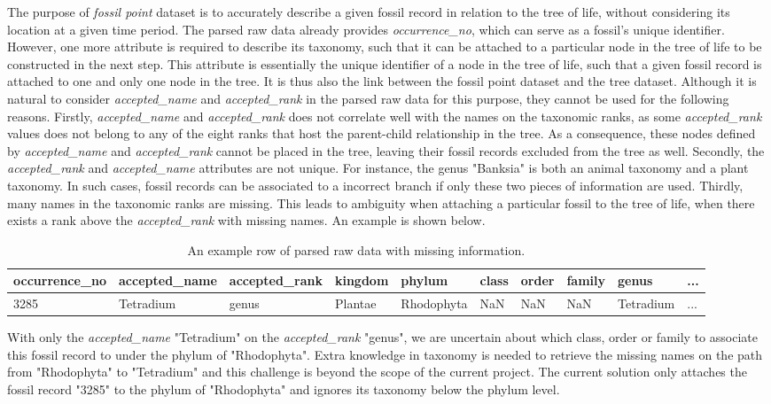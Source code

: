 \documentclass[11pt, a4paper,oneside,chapterprefix=false]{scrbook}
\begin{document}
The purpose of \emph{fossil point} dataset is to accurately describe a given fossil record in relation to the tree of life, without considering its location at a given time period. The parsed raw data already provides \emph{occurrence\_no}, which can serve as a fossil's unique identifier. However, one more attribute is required to describe its taxonomy, such that it can be attached to a particular node in the tree of life to be constructed in the next step. This attribute is essentially the unique identifier of a node in the tree of life, such that a  given fossil record is attached to one and only one node in the tree. It is thus also the link between the fossil point dataset and the tree dataset. Although it is natural to consider \emph{accepted\_name} and \emph{accepted\_rank} in the parsed raw data for this purpose, they cannot be used for the following reasons. Firstly, \emph{accepted\_name} and \emph{accepted\_rank} does not correlate well with the names on the taxonomic ranks, as some \emph{accepted\_rank} values does not belong to any of the eight ranks that host the parent-child relationship in the tree. As a consequence, these nodes defined by \emph{accepted\_name} and \emph{accepted\_rank} cannot be placed in the tree, leaving their fossil records excluded from the tree as well. Secondly, the \emph{accepted\_rank} and \emph{accepted\_name} attributes are not unique. For instance, the genus "Banksia" is both an animal taxonomy and a plant taxonomy. In such cases, fossil records can be associated to a incorrect branch if only these two pieces of information are used. Thirdly, many names in the taxonomic ranks are missing. This leads to ambiguity when attaching a particular fossil to the tree of life, when there exists a rank above the \emph{accepted\_rank} with missing names. An example is shown below.

\begin{table}[h]
	\centering
	\begin{tabular}{|l|l|l|l|l|l|l|l|l|l|}
		\hline
		occurrence\_no &  accepted\_name & accepted\_rank & kingdom &	phylum & class & order & family & genus & ... \\ \hline
		3285 &  Tetradium & genus & Plantae & Rhodophyta & NaN & NaN & NaN & Tetradium & ... \\ \hline
	\end{tabular}
	\caption{An example row of parsed raw data with missing information.}
	\label{tab:missing_information}
\end{table}

With only the \emph{accepted\_name} "Tetradium" on the \emph{accepted\_rank} "genus", we are uncertain about which class, order or family to associate this fossil record to under the phylum of "Rhodophyta". Extra knowledge in taxonomy is needed to retrieve the missing names on the path from "Rhodophyta" to "Tetradium" and this challenge is beyond the scope of the current project. The current solution only attaches the fossil record "3285" to the phylum of "Rhodophyta" and ignores its taxonomy below the phylum level. \\
\end{document}
